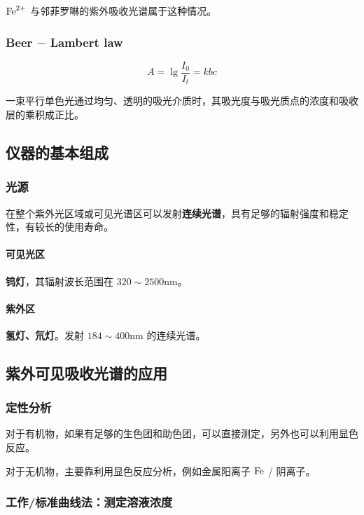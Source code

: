 $\ce{Fe^{2+}}$ 与邻菲罗啉的紫外吸收光谱属于这种情况。

\subsubsection{Beer $-$ Lambert law}

\begin{equation}
    A = \lg \frac{I_0}{I_t} = kbc
\end{equation}

一束平行单色光通过均匀、透明的吸光介质时，其吸光度与吸光质点的浓度和吸收层的乘积成正比。

\subsection{仪器的基本组成}

\subsubsection{光源}

在整个紫外光区域或可见光谱区可以发射\textbf{连续光谱}，具有足够的辐射强度和稳定性，有较长的使用寿命。

\paragraph{可见光区} \textbf{钨灯}，其辐射波长范围在 $320 \sim 2500 \mathrm{nm}$。

\paragraph{紫外区} \textbf{氢灯、氘灯}。发射 $184 \sim 400 \mathrm{nm}$ 的连续光谱。

\subsection{紫外可见吸收光谱的应用}

\subsubsection{定性分析}

对于有机物，如果有足够的生色团和助色团，可以直接测定，另外也可以利用显色反应。

对于无机物，主要靠利用显色反应分析，例如金属阳离子 $\ce{Fe}$ / 阴离子。

\subsubsection{工作/标准曲线法：测定溶液浓度}


